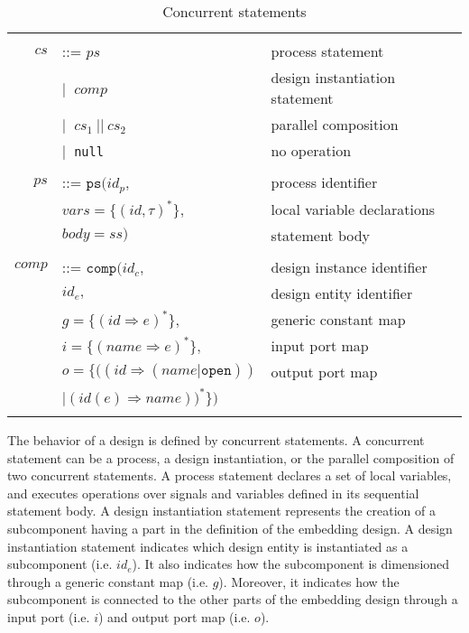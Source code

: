 \begin{table}[!htbp]
  \caption{Concurrent statements}
  \label{tab:cs}
  \begin{tabular}{|rll|}
    \hline
    & & \\
    $cs$ & ::= $ps$ & process statement \\
    & $\vert{}~$ $comp$ & design instantiation statement \\
    & $\vert{}~$ $cs_1~\mathtt{||}~cs_2$ & parallel composition \\
    & $\vert{}~$ \texttt{null} & no operation \\
    & & \\
    $ps$ & ::= $\mathtt{ps}(id_p,$ & process identifier \\
    & \quad\quad\quad${}vars=\{(id,\tau)^{*}\},$ & local variable declarations\\
    & \quad\quad\quad${}body=ss)$ & statement body \\
    & & \\
    $comp$ & ::= $\mathtt{comp}(id_c,$ & design instance identifier \\
      & \quad\quad\quad\quad$id_e,$ & design entity identifier \\
      & \quad\quad\quad\quad${}g=\{(id\Rightarrow{}e)^{*}\},$ & generic constant map \\
      & \quad\quad\quad\quad${}i=\{(name\Rightarrow{}e)^{*}\},$ & input port map \\
    & \quad\quad\quad\quad$o=\{\big((id\Rightarrow{}(name\vert{}\mathtt{open}))$ & output port map \\
    & \quad\quad\quad\quad\quad\quad\quad$\big\vert{}(id(e)\Rightarrow{}name)\big)^{*}\})$ &  \\
    & & \\
    \hline
  \end{tabular}

\end{table}

The behavior of a design is defined by concurrent statements. A
concurrent statement can be a process, a design instantiation, or the
parallel composition of two concurrent statements. A process statement
declares a set of local variables, and executes operations over
signals and variables defined in its sequential statement body. A
design instantiation statement represents the creation of a
subcomponent having a part in the definition of the embedding
design. A design instantiation statement indicates which design entity
is instantiated as a subcomponent (i.e. $id_e$). It also indicates how
the subcomponent is dimensioned through a generic constant map
(i.e. $g$). Moreover, it indicates how the subcomponent is connected
to the other parts of the embedding design through a input port
(i.e. $i$) and output port map (i.e. $o$).

